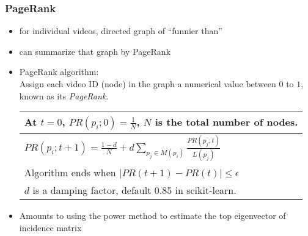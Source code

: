 \documentclass[fleqn]{beamer}
\begin{document}
\begin{frame}
\frametitle{PageRank}
      \begin{itemize}
         \item for individual videos, directed graph of ``funnier than''
         \item can summarize that graph by PageRank
         \item PageRank algorithm: \\
               Assign each video ID (node) in the graph a numerical value
                between $0$ to $1$, known as its \textsl{PageRank}.
         \begin{center}
         \begin{tabular}{| l |}
         \hline
         At $t=0$, $PR(p_{i};0) = \frac{1}{N}$, $N$ is the total number of nodes. \\ \hline
         $PR(p_{i};t+1) = \frac{1-d}{N} + d \sum_{p_{j} \in M(p_{i})} \frac{PR(p_{j};t)}{L(p_{j})}$ \\ \hline
         Algorithm ends when $|PR(t+1) - PR(t)| \le \epsilon$ \\ \hline
         $d$ is a damping factor, default $0.85$ in scikit-learn. \\
         \hline
         \end{tabular}
         \end{center}
         \item Amounts to using the power method to estimate the top eigenvector of incidence matrix
     \end{itemize}

\end{frame}
\end{document}
